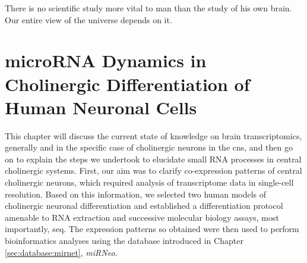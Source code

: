 \begin{savequote}[60mm]
There is no scientific study more vital to man than the study of his own brain. Our entire view of the universe depends on it.
\end{savequote}





\chapter{microRNA Dynamics in Cholinergic Differentiation of Human Neuronal Cells}
This chapter will discuss the current state of knowledge on brain transcriptomics, generally and in the specific case of cholinergic neurons in the \ac{cns}, and then go on to explain the steps we undertook to elucidate small RNA processes in central cholinergic systems. First, our aim was to clarify co-expression patterns of central cholinergic neurons, which required analysis of transcriptome data in single-cell resolution. Based on this information, we selected two human models of cholinergic neuronal differentiation and established a differentiation protocol amenable to RNA extraction and successive molecular biology assays, most importantly, \ac{seq}. The expression patterns so obtained were then used to perform bioinformatics analyses using the database introduced in Chapter \ref{sec:database:mirnet}, \textit{miRNeo}. 









